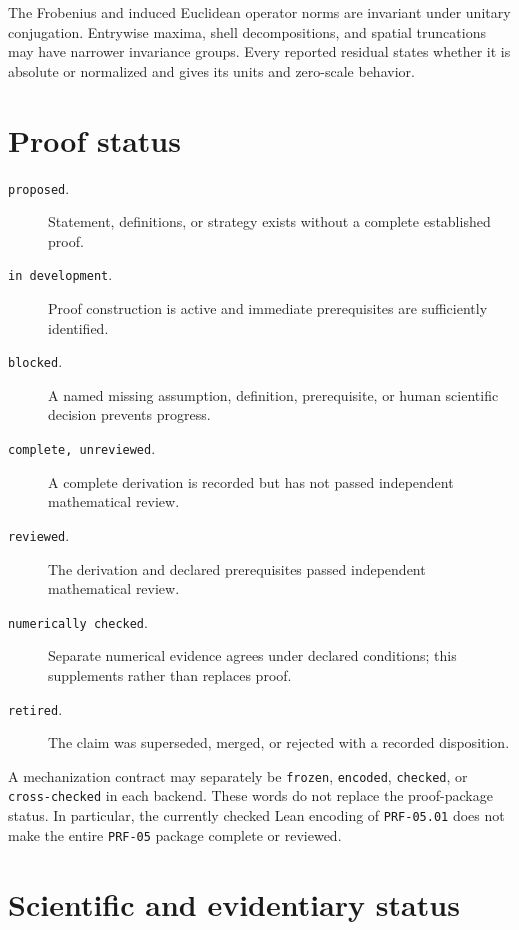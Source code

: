 The Frobenius and induced Euclidean operator norms are invariant under unitary
conjugation. Entrywise maxima, shell decompositions, and spatial truncations may
have narrower invariance groups. Every reported residual states whether it is
absolute or normalized and gives its units and zero-scale behavior.

\section{Proof status}

\begin{description}
  \item[\texttt{proposed}.] Statement, definitions, or strategy exists without a
    complete established proof.
  \item[\texttt{in development}.] Proof construction is active and immediate
    prerequisites are sufficiently identified.
  \item[\texttt{blocked}.] A named missing assumption, definition, prerequisite,
    or human scientific decision prevents progress.
  \item[\texttt{complete, unreviewed}.] A complete derivation is recorded but
    has not passed independent mathematical review.
  \item[\texttt{reviewed}.] The derivation and declared prerequisites passed
    independent mathematical review.
  \item[\texttt{numerically checked}.] Separate numerical evidence agrees under
    declared conditions; this supplements rather than replaces proof.
  \item[\texttt{retired}.] The claim was superseded, merged, or rejected with a
    recorded disposition.
\end{description}

A mechanization contract may separately be \texttt{frozen}, \texttt{encoded},
\texttt{checked}, or \texttt{cross-checked} in each backend. These words do not
replace the proof-package status. In particular, the currently checked Lean
encoding of \texttt{PRF-05.01} does not make the entire \texttt{PRF-05} package
complete or reviewed.

\section{Scientific and evidentiary status}


